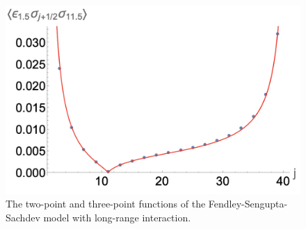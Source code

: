 \documentclass[prb,twocolumn,11pt]{revtex4-1}
\begin{document}
\begin{figure}[htbp]
\includegraphics[scale=0.35]{ess_long_range2.png}
\caption{The two-point and three-point functions of the Fendley-Sengupta-Sachdev model with long-range interaction.}
\label{correlationsHBlong}
\end{figure}

%

\end{document}
